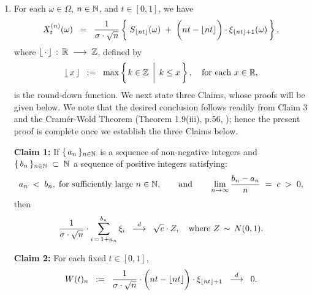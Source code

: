 \begin{enumerate}
\item	For each $\omega \in \Omega$, $n \in\mathbb{N}$, and $t \in [0,1]$, we have
		\begin{equation*}
		X^{(n)}_{t}(\omega)
		\;\; = \;\;
		\dfrac{1}{\sigma\cdot\sqrt{n}}
		\left\{\;
		S_{\lfloor nt \rfloor}(\omega) \;+\; \left(\overset{{\color{white}1}}{nt} - \lfloor nt \rfloor\right)\cdot\xi_{\lfloor nt \rfloor+1}(\omega)
		\,\right\},
		\end{equation*}
		where $\lfloor\,\cdot\,\rfloor\,:\,\mathbb{R}\;\longrightarrow\;\mathbb{Z}$, defined by
		\begin{equation*}
		\lfloor\,x\,\rfloor
		\;\;:=\;\;
		\max\left\{
		\left. k \in \overset{{\color{white}1}}{\Z} \,\;\right\vert\; k \leq x
		\,\right\},
		\quad
		\textnormal{for each $x \in \Re$},
		\end{equation*}
		is the round-down function.
		We next state three Claims, whose proofs will be given below.
		We note that the desired conclusion follows readily from Claim 3 and
		the Cram\'{e}r-Wold Theorem (Theorem 1.9(iii), p.56, \cite{Shao2003});
		hence the present proof is complete once we establish the three
		Claims below.

		\vskip 0.5cm
		\begin{center}
		\begin{minipage}{6.0in}
		\noindent
		\textbf{Claim 1:}\quad
		If \;$\{\,a_{n}\,\}_{n\in\mathbb{N}}$\; is a sequence of non-negative integers and
		\;$\{\,b_{n}\,\}_{n\in\mathbb{N}} \;\subset\; \mathbb{N}$\; a sequence of positive integers
		satisfying:
		\begin{equation*}
		a_{n} \;<\; b_{n}, \;\textnormal{for sufficiently large $n\in\mathbb{N}$},
		\quad\quad
		\textnormal{and}
		\quad\quad
		\lim_{n\rightarrow\infty}\dfrac{b_{n} - a_{n}}{n} \;=\; c \;>\; 0,
		\end{equation*}
		then
		\begin{equation*}
		\dfrac{1}{\sigma\cdot\sqrt{n}}\cdot\sum_{i\,=\,1+a_{n}}^{b_{n}}\xi_{i}
		\;\; \overset{d}{\longrightarrow} \;\;
		\sqrt{c}\cdot Z,
		\quad
		\textnormal{where $Z\,\sim\,N(0,1)$}.
		\end{equation*}
		\end{minipage}
		\end{center}

		\vskip 0.5cm
		\begin{center}
		\begin{minipage}{6.0in}
		\noindent
		\textbf{Claim 2:}
		\quad For each fixed $t \in [0,1]$,
		\begin{equation*}
		W(t)_{n} \;\; := \;\;
		\dfrac{1}{\sigma\cdot\sqrt{n}}
		\cdot
		\left(\overset{{\color{white}1}}{nt} - \lfloor nt \rfloor\right)
		\cdot
		\xi_{\lfloor nt \rfloor + 1}
		\;\; \overset{d}{\longrightarrow} \;\;
		0.
		\end{equation*}
		\end{minipage}
		\end{center}


\end{enumerate}
